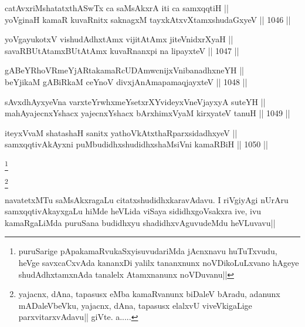 \begin{shl}
catAvxriMshatatxthA\s SwTx ca saMsAkxrA iti ca samxqqtiH || \\
yoVginaH kamaR kuvaRnitx saknagxM tayxkAtxvX\s \s tamxshudaGxyeV ||  1046 ||  
\end{shl}
				
\begin{shl}
yoVgayukotxV vishudAdhxtAmx vijitAtAmx jiteVnidxrXyaH || \\
savaRBUtAtamxBUtAtAmx kuvaRnanxpi na lipayxteV ||  1047 ||  
\end{shl}
				
\begin{shl}
gABeYRhoVRmeYjARtakamaRcUDAmwcnijxVnibanadhxneYH || \\
beYjikaM gABiRkaM ceYnoV divxjAnAmapamaqjayxteV ||  1048 ||  
\end{shl}
				
\begin{shl}
sAvxdhAyxyeVna varxteYrwhxmeYsetxrXYvideyxVneVjayxyA suteYH || \\
mahAyajecnxYshacx yajecnxYshacx bArxhimxVyaM kirxyateV tanuH ||  1049 ||  
\end{shl}
				
\begin{shl}
iteyxVvaM shatashaH sanitx yathoVkAtxthaRparxsidadhxyeV ||  \\
samxqqtivAkAyxni puMbudidhxshudidhxshaMsiVni kamaRBiH ||  1050 ||  
\end{shl}

\begin{artha}
\footnote{puruSarige pApakamaRvukaSxyisuvudariMda jAcnxnavu huTuTxvudu, heVge savxcaCxvAda kananxDi yalilx tananxnunx noVDikoLuLxvano hAgeye shudAdhxtamxnAda  tanalelx Atamxnanunx noVDuvanu||}
\end{artha}

\begin{artha}
\footnote{yajacnx, dAna, tapasusx eMba kamaRvanunx biDaleV bAradu, adanunx mADaleVbeVku, yajacnx, dAna, tapasusx elalxvU viveVkigaLige parxvitarxvAdavu|| giVte. a.....}
\end{artha}

\begin{artha}
navatetxMTu saMsAkxragaLu citatxshudidhxkaravAdavu. I riVgiyAgi nUrAru samxqqtivAkayxgaLu hiMde heVLida viSaya sididhxgoVsakxra ive, ivu kamaRgaLiMda puruSana budidhxyu shadidhxvAguvudeMdu heVLuvavu||
\end{artha}


